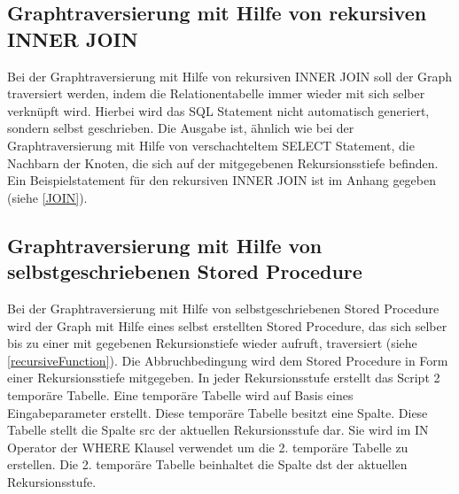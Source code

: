 \subsection{Graphtraversierung mit Hilfe von rekursiven INNER JOIN}
Bei der Graphtraversierung mit Hilfe von rekursiven INNER JOIN soll der Graph traversiert werden, indem die Relationentabelle immer wieder mit sich selber verknüpft wird. Hierbei
wird das SQL Statement nicht automatisch generiert, sondern selbst geschrieben.
Die Ausgabe ist, ähnlich wie bei der Graphtraversierung mit Hilfe von verschachteltem SELECT Statement, die Nachbarn der Knoten, die sich auf der mitgegebenen Rekursionsstiefe
befinden. Ein Beispielstatement für den rekursiven INNER JOIN ist im Anhang gegeben (siehe \ref{JOIN}).

\subsection{Graphtraversierung mit Hilfe von selbstgeschriebenen Stored Procedure}
Bei der Graphtraversierung mit Hilfe von selbstgeschriebenen Stored Procedure wird der Graph mit Hilfe eines selbst erstellten Stored Procedure, das sich selber bis
zu einer mit gegebenen Rekursionstiefe wieder aufruft, traversiert (siehe \ref{recursiveFunction}). Die Abbruchbedingung wird dem Stored Procedure in Form einer Rekursionsstiefe mitgegeben. In jeder
Rekursionsstufe erstellt das Script 2 temporäre Tabelle. Eine temporäre Tabelle wird auf Basis eines Eingabeparameter erstellt. Diese temporäre Tabelle besitzt eine Spalte.
Diese Tabelle stellt die Spalte src der aktuellen Rekursionsstufe dar. Sie wird im IN Operator der WHERE Klausel verwendet um die 2. temporäre Tabelle zu erstellen. Die 2.
temporäre Tabelle beinhaltet die Spalte dst der aktuellen Rekursionsstufe.

